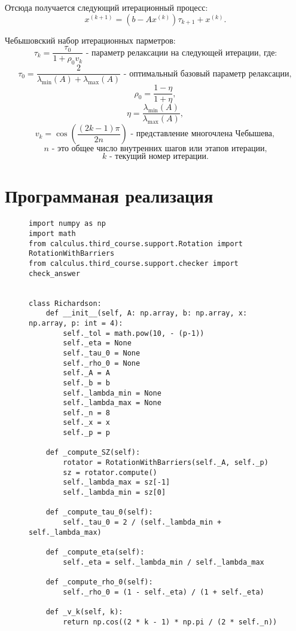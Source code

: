 \documentclass[a4paper,12pt]{article}
\begin{document}
	Отсюда получается следующий итерационный процесс:
	\[
		x^{(k+1)} = \left(b - A x^{(k)}\right) \tau_{k+1} + x^{(k)}.
	\]
	
	Чебышовский набор итерационных парметров:
	$$\tau_k = \frac{\tau_0}{1 + \rho_0 v_k} \text{ - параметр релаксации на следующей итерации, где:} $$
	$$\tau_0 = \frac{2}{\lambda_{\min}(A) + \lambda_{\max}(A)} \text{ - оптимальный базовый параметр релаксации},$$
	$$\rho_0 = \frac{1 - \eta}{1 + \eta},$$
	$$\eta = \frac{\lambda_{\min}(A)}{\lambda_{\max}(A)},$$
	$$v_k = \cos\left(\frac{(2k - 1)\pi}{2n}\right) \text{ - представление многочлена Чебышева},$$
	$$n \text{ - это общее число внутренних шагов или этапов итерации,}$$
	$$k \text{ - текущий номер итерации.}$$
	

	\newpage
	\section{Программаная реализация}
	\begin{figure}[h]
		\begin{verbatim}
import numpy as np
import math
from calculus.third_course.support.Rotation import RotationWithBarriers
from calculus.third_course.support.checker import check_answer


class Richardson:
	def __init__(self, A: np.array, b: np.array, x: np.array, p: int = 4):
		self._tol = math.pow(10, - (p-1))
		self._eta = None
		self._tau_0 = None
		self._rho_0 = None
		self._A = A
		self._b = b
		self._lambda_min = None
		self._lambda_max = None
		self._n = 8
		self._x = x
		self._p = p
	
	def _compute_SZ(self):
		rotator = RotationWithBarriers(self._A, self._p)
		sz = rotator.compute()
		self._lambda_max = sz[-1]
		self._lambda_min = sz[0]
	
	def _compute_tau_0(self):
		self._tau_0 = 2 / (self._lambda_min + self._lambda_max)
	
	def _compute_eta(self):
		self._eta = self._lambda_min / self._lambda_max
	
	def _compute_rho_0(self):
		self._rho_0 = (1 - self._eta) / (1 + self._eta)

	def _v_k(self, k):
		return np.cos((2 * k - 1) * np.pi /	(2 * self._n))
		\end{verbatim}
	\end{figure}
	\newpage
\end{document}
